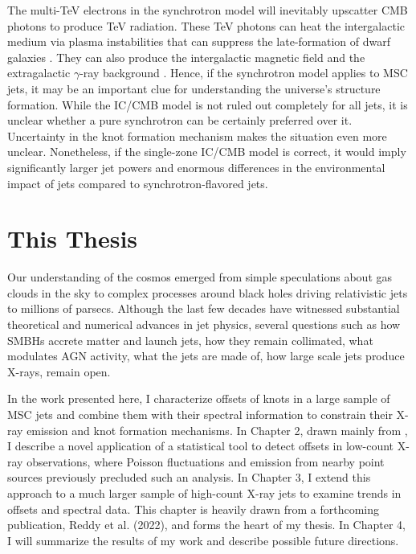 The multi-TeV electrons in the synchrotron model will inevitably upscatter CMB photons to produce TeV radiation. These TeV photons can heat the intergalactic medium via plasma instabilities \citep[e.g.,][]{broderick2012cosmological,chang2012cosmological} that can suppress the late-formation of dwarf galaxies \citep{pfrommer2012cosmological}. They can also produce the intergalactic magnetic field and the extragalactic $\gamma$-ray background \citep{broderick2012cosmological,blandford2019relativistic}. Hence, if the synchrotron model applies to MSC jets, it may be an important clue for understanding the universe's structure formation. While the IC/CMB model is not ruled out completely for all jets, it is unclear whether a pure synchrotron can be certainly preferred over it. Uncertainty in the knot formation mechanism makes the situation even more unclear. Nonetheless, if the single-zone IC/CMB model is correct, it would imply significantly larger jet powers and enormous differences in the environmental impact of jets compared to synchrotron-flavored jets.

\section{This Thesis}
Our understanding of the cosmos emerged from simple speculations about gas clouds in the sky to complex processes around black holes driving relativistic jets to millions of parsecs. Although the last few decades have witnessed substantial theoretical and numerical advances in jet physics, several questions such as how SMBHs accrete matter and launch jets, how they remain collimated, what modulates AGN activity, what the jets are made of, how large scale jets produce X-rays, remain open. 

In the work presented here, I characterize offsets of knots in a large sample of MSC jets and combine them with their spectral information to constrain their X-ray emission and knot formation mechanisms. In Chapter 2, drawn mainly from \citet{2021ApJS..253...37R}, I describe a novel application of a statistical tool to detect offsets in low-count X-ray observations, where Poisson fluctuations and emission from nearby point sources previously precluded such an analysis. In Chapter 3, I extend this approach to a much larger sample of high-count X-ray jets to examine trends in offsets and spectral data. This chapter is heavily drawn from a forthcoming publication, Reddy et al. (2022), and forms the heart of my thesis. In Chapter 4, I will summarize the results of my work and describe possible future directions.













